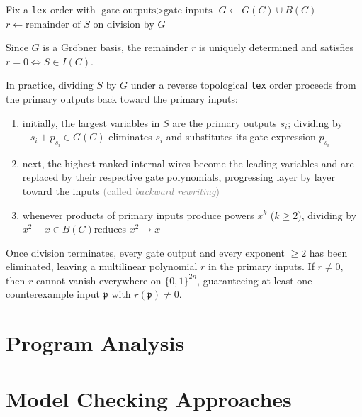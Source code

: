 \documentclass[a4paper, 11pt]{report}
\begin{document}
\begin{algorithm}[H]
\caption{Algebraic Verification}
Fix a \texttt{lex} order with $\text{gate outputs} > \text{gate inputs}$\;
$G \leftarrow G(C) \cup B(C)$\;
$r \leftarrow \text{remainder of } S \text{ on division by } G$\;
\end{algorithm}

Since $G$ is a Gr\"obner basis, the remainder $r$ is uniquely determined and satisfies $r = 0 \iff S \in I(C)$. 

In practice, dividing $S$ by $G$ under a reverse topological \texttt{lex} order proceeds from the primary outputs back toward the primary inputs:
\begin{enumerate}
    \item initially, the largest variables in $S$ are the primary outputs $s_i$; dividing by $-s_i + p_{s_i} \in G(C)$ eliminates $s_i$ and substitutes its gate expression $p_{s_i}$
    \item next, the highest-ranked internal wires become the leading variables and are replaced by their respective gate polynomials, progressing layer by layer toward the inputs \textcolor{gray}{(called \emph{backward rewriting})}
    \item whenever products of primary inputs produce powers $x^k$ ($k \ge 2$), dividing by $x^2 - x \in B(C)$reduces $x^2 \to x$
\end{enumerate}
Once division terminates, every gate output and every exponent $\ge 2$ has been eliminated, leaving a multilinear polynomial $r$ in the primary inputs. If $r \neq 0$, then $r$ cannot vanish everywhere on $\{0,1\}^{2n}$, guaranteeing at least one counterexample input $\mathfrak{p}$ with $r(\mathfrak{p}) \neq 0$.

\chapter{Program Analysis}
\chapter{Model Checking Approaches}
\end{document}
